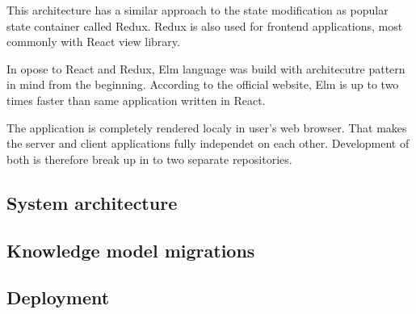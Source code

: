 This architecture has a similar approach to the state modification as popular state container called Redux.
Redux is also used for frontend applications, most commonly with React view library.

In opose to React and Redux, Elm language was build with architecutre pattern in mind from the beginning.
According to the official website\cite{elm-speed}, Elm is up to two times faster than same application written in React.

The application is completely rendered localy in user's web browser.
That makes the server and client applications fully independet on each other.
Development of both is therefore break up in to two separate repositories.

\subsection{System architecture}

\subsection{Knowledge model migrations}

\subsection{Deployment}

